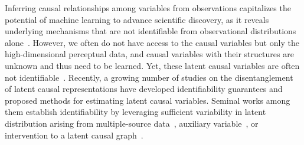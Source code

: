 \documentclass[10pt]{article}
\numberwithin{figure}{section}
\begin{document}
Inferring causal relationships among variables from observations capitalizes the potential of machine learning to advance scientific discovery, as it reveals underlying mechanisms that are not identifiable from observational distributions alone~\citep{pearl2009causality}.  %
However, we often do not have access to the causal variables but only the high-dimensional perceptual data, and  causal variables with their structures are unknown and thus need to be learned. Yet, these latent causal variables are often not identifiable~\citep{hyvarinen_nonlinear_1999,sorrenson_disentanglement_2020}.  Recently, a growing number of studies on the disentanglement of latent causal representations have developed identifiability guarantees and proposed methods for estimating latent causal variables. Seminal works among them establish identifiability by leveraging sufficient variability in latent distribution arising from multiple-source data~\citep{yao_temporally_2022,song_temporally_2023}, auxiliary variable~\citep{hyvarinen_nonlinear_1999,hyvarinen_unsupervised_2016,hyvarinen_nonlinear_2017,hyvarinen_nonlinear_2019}, or intervention to a latent causal graph~\citep{ahuja_interventional_2023,pmlr-v202-squires23a,jiang_learning_2023,bing_identifying_2024,buchholz_learning_2023}.
\end{document}
